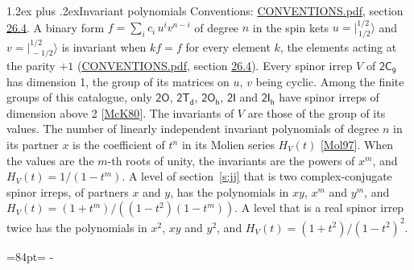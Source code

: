 \documentclass[10pt,a4paper]{article}
\makeatletter
\renewcommand\section{\@startsection{section}{1}{\z@}{-3ex plus -1ex minus -.2ex}%
  {1.2ex plus .2ex}{\normalfont\large\sffamily\bfseries\color{parttitle}}}
\newcommand{\needspace}[1]{\par\penalty-100\begingroup\dimen0=#1\relax\dimen2=\pagegoal
  \advance\dimen2-\pagetotal\ifdim\dimen0>\dimen2\relax\ifdim\dimen2>0pt\vfil\break\fi\fi
  \endgroup}
\numberwithin{equation}{section}
\newcommand{\grp}[1]{\mathsf{#1}}
\newcommand{\jm}[2]{\bigl\lvert{}^{#1}_{\,#2}\bigr\rangle}
\makeatother
\begin{document}
\section{Invariant polynomials}\label{s:invariants}
Conventions: \href{../../CONVENTIONS.pdf}{CONVENTIONS.pdf}, section \href{../../CONVENTIONS.pdf\#conv.26.4}{26.4}.
\leavevmode\label{n:local.binary.form}A binary form $f = \sum_i c_i\, u^i v^{n-i}$ of degree $n$ in the spin kets $u = \jm{1/2}{1/2}$ and $v = \jm{1/2}{-1/2}$ is invariant when $k f = f$ for every element $k$, the elements acting at the parity $+1$ (\href{../../CONVENTIONS.pdf}{CONVENTIONS.pdf}, section \href{../../CONVENTIONS.pdf\#conv.26.4}{26.4}).
\leavevmode\label{n:function.hilbert}Every spinor irrep $V$ of $\grp{2C_{9}}$ has dimension 1, the group of its matrices on $u$, $v$ being cyclic. Among the finite groups of this catalogue, only $\grp{2O}$, $\grp{2T_{d}}$, $\grp{2O_{h}}$, $\grp{2I}$ and $\grp{2I_{h}}$ have spinor irreps of dimension above 2 [\href{../../../REFERENCES.pdf\#ref.McK80}{McK80}]. The invariants of $V$ are those of the group of its values. \label{n:local.partner.x}The number of linearly independent invariant polynomials of degree $n$ in its partner $x$ is the coefficient of $t^n$ in its Molien series $H_V(t)$ [\href{../../../REFERENCES.pdf\#ref.Mol97}{Mol97}]. When the values are the $m$-th roots of unity, the invariants are the powers of $x^{m}$, and $H_V(t) = 1/(1 - t^{m})$. A level of section~\ref{s:jj} that is two complex-conjugate spinor irreps, of partners $x$ and $y$, has the polynomials in $xy$, $x^{m}$ and $y^{m}$, and $H_V(t) = (1 + t^{m})/((1 - t^{2})(1 - t^{m}))$. A level that is a real spinor irrep twice has the polynomials in $x^{2}$, $xy$ and $y^{2}$, and $H_V(t) = (1 + t^{2})/(1 - t^{2})^{2}$.
\needspace{84pt}
\end{document}
